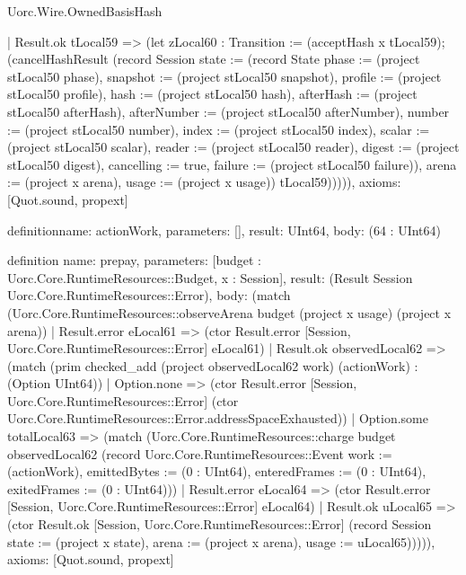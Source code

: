 \begin{lexlean}{Uorc.Wire.OwnedBasisHash}
\begin{semanticmodule}
{      | Result.ok tLocal59 => (let zLocal60 : Transition := (acceptHash x tLocal59); (cancelHashResult (record Session {state := (record State {phase := (project stLocal50 phase), snapshot := (project stLocal50 snapshot), profile := (project stLocal50 profile), hash := (project stLocal50 hash), afterHash := (project stLocal50 afterHash), afterNumber := (project stLocal50 afterNumber), number := (project stLocal50 number), index := (project stLocal50 index), scalar := (project stLocal50 scalar), reader := (project stLocal50 reader), digest := (project stLocal50 digest), cancelling := true, failure := (project stLocal50 failure)}), arena := (project x arena), usage := (project x usage)}) tLocal59))))),
  axioms: [Quot.sound, propext]
}

definition{name: actionWork, parameters: [], result: UInt64, body: (64 : UInt64)}

definition{
  name: prepay,
  parameters: [budget : Uorc.Core.RuntimeResources::Budget, x : Session],
  result: (Result Session Uorc.Core.RuntimeResources::Error),
  body: (match (Uorc.Core.RuntimeResources::observeArena budget (project x usage) (project x arena))
    | Result.error eLocal61 => (ctor Result.error [Session, Uorc.Core.RuntimeResources::Error] eLocal61)
    | Result.ok observedLocal62 => (match (prim checked_add (project observedLocal62 work) (actionWork) : (Option UInt64))
      | Option.none => (ctor Result.error [Session, Uorc.Core.RuntimeResources::Error] (ctor Uorc.Core.RuntimeResources::Error.addressSpaceExhausted))
      | Option.some totalLocal63 => (match (Uorc.Core.RuntimeResources::charge budget observedLocal62 (record Uorc.Core.RuntimeResources::Event {work := (actionWork), emittedBytes := (0 : UInt64), enteredFrames := (0 : UInt64), exitedFrames := (0 : UInt64)}))
        | Result.error eLocal64 => (ctor Result.error [Session, Uorc.Core.RuntimeResources::Error] eLocal64)
        | Result.ok uLocal65 => (ctor Result.ok [Session, Uorc.Core.RuntimeResources::Error] (record Session {state := (project x state), arena := (project x arena), usage := uLocal65}))))),
  axioms: [Quot.sound, propext]
}


\end{semanticmodule}
\end{lexlean}
